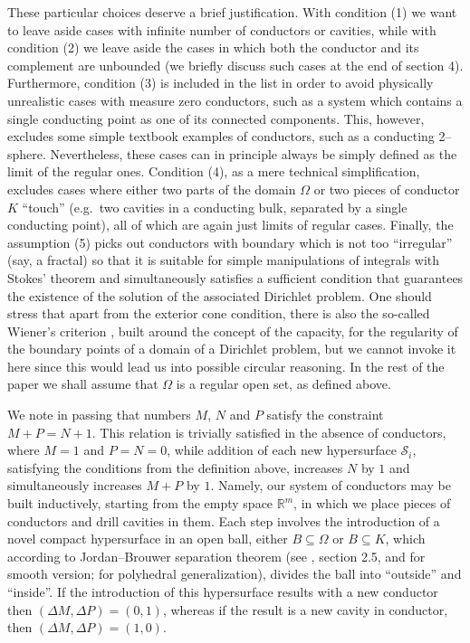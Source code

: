 \documentclass[12pt]{iopart}
\newcommand{\0}{\vct{0}}
\newcommand{\rr}{\mathds{R}}
\theoremstyle{plain} \newtheorem{tm}{Theorem}[section]
\theoremstyle{plain} \newtheorem{lm}[tm]{Lemma}
\theoremstyle{definition} \newtheorem{defn}[tm]{Definition}
\begin{document}
\medskip



These particular choices deserve a brief justification. With condition (1) we want to leave aside cases with infinite number of conductors or cavities, while with condition (2) we leave aside the cases in which both the conductor and its complement are unbounded (we briefly discuss such cases at the end of section 4). Furthermore, condition (3) is included in the list in order to avoid physically unrealistic cases with measure zero conductors, such as a system which contains a single conducting point as one of its connected components. This, however, excludes some simple textbook examples of conductors, such as a conducting 2--sphere. Nevertheless, these cases can in principle always be simply defined as the limit of the regular ones. Condition (4), as a mere technical simplification, excludes cases where either two parts of the domain $\Omega$ or two pieces of conductor $K$ ``touch'' (e.g.~two cavities in a conducting bulk, separated by a single conducting point), all of which are again just limits of regular cases. Finally, the assumption (5) picks out conductors with boundary which is not too ``irregular'' (say, a fractal) so that it is suitable for simple manipulations of integrals with Stokes' theorem \cite{LeeSmooth,Federer,Morgan} and simultaneously satisfies a sufficient condition that guarantees the existence of the solution of the associated Dirichlet problem. One should stress that apart from the exterior cone condition, there is also the so-called Wiener's criterion \cite{GT,Kellogg}, built around the concept of the capacity, for the regularity of the boundary points of a domain of a Dirichlet problem, but we cannot invoke it here since this would lead us into possible circular reasoning. In the rest of the paper we shall assume that $\Omega$ is a regular open set, as defined above.


\medskip

We note in passing that numbers $M$, $N$ and $P$ satisfy the constraint $M+P=N+1$. This relation is trivially satisfied in the absence of conductors, where $M=1$ and $P=N=0$, while addition of each new hypersurface $\mathcal{S}_i$, satisfying the conditions from the definition above, increases $N$ by $1$ and simultaneously increases $M+P$ by $1$. Namely, our system of conductors may be built inductively, starting from the empty space $\rr^m$, in which we place pieces of conductors and drill cavities in them. Each step involves the introduction of a novel compact hypersurface in an open ball, either $B \subseteq \Omega$ or $B \subseteq K$, which according to Jordan--Brouwer separation theorem (see \cite{GP}, section 2.5, and \cite{Lima88,McGrath16} for smooth version; \cite{PMK09} for polyhedral generalization), divides the ball into ``outside'' and ``inside''. If the introduction of this hypersurface results with a new conductor then $(\Delta M,\Delta P) = (0,1)$, whereas if the result is a new cavity in conductor, then $(\Delta M,\Delta P) = (1,0)$.
\end{document}
